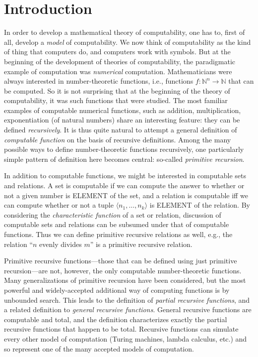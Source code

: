 \documentclass[10pt,a4paper]{article}
\newcommand*{\olup}[1]{\MakeUppercase{#1}}
\theoremstyle{plain}
\theoremstyle{definition}
\theoremstyle{remark}
\newcommand*{\olfileid}[3]{}
\newcommand*{\olsection}[1]{\section*{#1}}
\providecommand{\tuple}[1]{\langle #1 \rangle}
\providecommand{\Nat}{\ensuremath{\mathbb{N}}}
\begin{document}



\olfileid{cmp}{rec}{int}
\olsection{Introduction}

In order to develop a mathematical theory of computability, one has to,
first of all, develop a \emph{model} of computability.  We now think of
computability as the kind of thing that computers do, and computers
work with symbols.  But at the beginning of the development of
theories of computability, the paradigmatic example of computation was
\emph{numerical} computation.  Mathematicians were always interested
in number-theoretic functions, i.e., functions $f\colon \Nat^n \to
\Nat$ that can be computed. So it is not surprising that at the
beginning of the theory of computability, it was such functions that
were studied.  The most familiar examples of computable numerical
functions, such as addition, multiplication, exponentiation (of
natural numbers) share an interesting feature: they can be defined
\emph{recursively}.  It is thus quite natural to attempt a general
definition of \emph{computable function} on the basis of recursive
definitions.  Among the many possible ways to define number-theoretic
functions recursively, one particularly simple pattern of definition
here becomes central: so-called \emph{primitive recursion}.

In addition to computable functions, we might be interested in
computable sets and relations. A set is computable if we can compute
the answer to whether or not a given number is \olup{element} of the
set, and a relation is computable iff we can compute whether or not a
tuple $\tuple{n_1, \dots, n_k}$ is \olup{element} of the relation.  By
considering the \emph{characteristic function} of a set or relation,
discussion of computable sets and relations can be subsumed under that
of computable functions.  Thus we can define primitive recursive
relations as well, e.g., the relation ``$n$ evenly divides $m$'' is a
primitive recursive relation.

Primitive recursive functions---those that can be defined using just
primitive recursion---are not, however, the only computable
number-theoretic functions. Many generalizations of primitive
recursion have been considered, but the most powerful and
widely-accepted additional way of computing functions is by unbounded
search.  This leads to the definition of \emph{partial recursive
  functions}, and a related definition to \emph{general recursive
  functions}.  General recursive functions are computable and total,
and the definition characterizes exactly the partial recursive
functions that happen to be total.  Recursive functions can simulate
every other model of computation (Turing machines, lambda calculus,
etc.) and so represent one of the many accepted models of computation.
\end{document}
